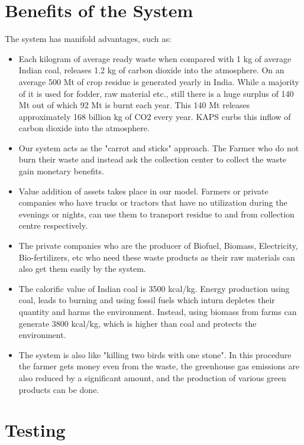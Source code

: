 \documentclass[conference]{IEEEtran}
\begin{document}
\section{Benefits of the System} 
The system has manifold advantages, such as: 
\begin{itemize} 
\item Each kilogram of average ready waste when compared with 1 kg of average Indian coal, releases 1.2 kg of carbon dioxide into the atmosphere. On an average 500 Mt of crop residue is generated yearly in India. While a majority of it is used
for fodder, raw material etc., still there is a huge surplus of 140 Mt out of which 92 Mt is burnt each year. This 140 Mt releases approximately 168 billion kg of CO\(2\) every year. KAPS curbs this inflow of carbon dioxide into the atmosphere. \cite{b10}
\item Our system acts as the "carrot and sticks" approach. The  Farmer who do not burn their waste and instead ask the collection  center to collect the waste gain monetary benefits. 
\item Value addition of assets takes place in our model. Farmers or private companies who have trucks or tractors that have no utilization during the evenings or nights, can use them to transport residue to and from collection centre respectively. 
\item The private companies who are the producer of Biofuel,  Biomass, Electricity, Bio-fertilizers, etc who need these waste  products as their raw materials can also get them easily by the system. 
\item The calorific value of Indian coal is 3500 kcal/kg. Energy production using coal, leads to burning and using fossil fuels which inturn depletes their quantity and harms the environment. Instead, using biomass from farms can generate 3800 kcal/kg, which is higher than coal and protects the environment. 
\item The system is also like "killing two birds with one stone". In this procedure the farmer gets money even from the waste, the greenhouse gas emissions are also reduced by a significant amount, and the production of various green products can be done.
 
\end{itemize}
\section{Testing}
\end{document}
